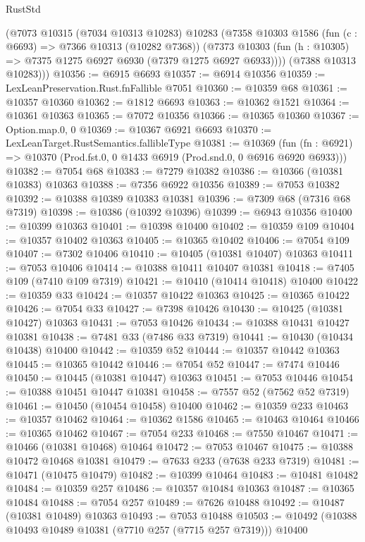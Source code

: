 \begin{lexlean}{RustStd}
\begin{coremodule}
      (@7073
        @10315
        (@7034 @10313 @10283)
        @10283
        (@7358
          @10303
          @1586
          (fun (c : @6693) => @7366 @10313 (@10282 @7368))
          (@7373 @10303 (fun (h : @10305) => @7375 @1275 @6927 @6930 (@7379 @1275 @6927 @6933))))
        (@7388 @10313 @10283)))
@10356 := @6915 @6693
@10357 := @6914 @10356
@10359 := LexLeanPreservation.Rust.fnFallible @7051
@10360 := @10359 @68
@10361 := @10357 @10360
@10362 := @1812 @6693
@10363 := @10362 @1521
@10364 := @10361 @10363
@10365 := @7072 @10356
@10366 := @10365 @10360
@10367 := Option.map.{0, 0}
@10369 := @10367 @6921 @6693
@10370 := LexLeanTarget.RustSemantics.fallibleType
@10381 := @10369
    (fun (fn : @6921) => @10370 (Prod.fst.{0, 0} @1433 @6919 (Prod.snd.{0, 0} @6916 @6920 @6933)))
@10382 := @7054 @68
@10383 := @7279 @10382
@10386 := @10366 (@10381 @10383) @10363
@10388 := @7356 @6922 @10356
@10389 := @7053 @10382
@10392 := @10388 @10389 @10383 @10381
@10396 := @7309 @68 (@7316 @68 @7319)
@10398 := @10386 (@10392 @10396)
@10399 := @6943 @10356
@10400 := @10399 @10363
@10401 := @10398 @10400
@10402 := @10359 @109
@10404 := @10357 @10402 @10363
@10405 := @10365 @10402
@10406 := @7054 @109
@10407 := @7302 @10406
@10410 := @10405 (@10381 @10407) @10363
@10411 := @7053 @10406
@10414 := @10388 @10411 @10407 @10381
@10418 := @7405 @109 (@7410 @109 @7319)
@10421 := @10410 (@10414 @10418) @10400
@10422 := @10359 @33
@10424 := @10357 @10422 @10363
@10425 := @10365 @10422
@10426 := @7054 @33
@10427 := @7398 @10426
@10430 := @10425 (@10381 @10427) @10363
@10431 := @7053 @10426
@10434 := @10388 @10431 @10427 @10381
@10438 := @7481 @33 (@7486 @33 @7319)
@10441 := @10430 (@10434 @10438) @10400
@10442 := @10359 @52
@10444 := @10357 @10442 @10363
@10445 := @10365 @10442
@10446 := @7054 @52
@10447 := @7474 @10446
@10450 := @10445 (@10381 @10447) @10363
@10451 := @7053 @10446
@10454 := @10388 @10451 @10447 @10381
@10458 := @7557 @52 (@7562 @52 @7319)
@10461 := @10450 (@10454 @10458) @10400
@10462 := @10359 @233
@10463 := @10357 @10462
@10464 := @10362 @1586
@10465 := @10463 @10464
@10466 := @10365 @10462
@10467 := @7054 @233
@10468 := @7550 @10467
@10471 := @10466 (@10381 @10468) @10464
@10472 := @7053 @10467
@10475 := @10388 @10472 @10468 @10381
@10479 := @7633 @233 (@7638 @233 @7319)
@10481 := @10471 (@10475 @10479)
@10482 := @10399 @10464
@10483 := @10481 @10482
@10484 := @10359 @257
@10486 := @10357 @10484 @10363
@10487 := @10365 @10484
@10488 := @7054 @257
@10489 := @7626 @10488
@10492 := @10487 (@10381 @10489) @10363
@10493 := @7053 @10488
@10503 := @10492 (@10388 @10493 @10489 @10381 (@7710 @257 (@7715 @257 @7319))) @10400

\end{coremodule}
\end{lexlean}
